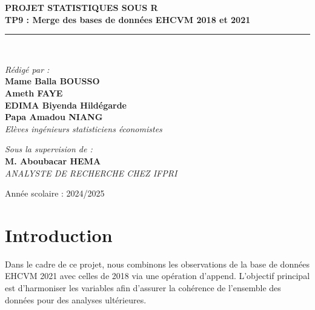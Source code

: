 \documentclass[
]{article}
\begin{document}
\begin{titlepage}
\begin{center}
        \textbf{\LARGE PROJET STATISTIQUES SOUS R }\\[0.3cm]
        \textbf{\Huge \color{black} \textsf{TP9 : Merge des bases de données EHCVM 2018 et 2021}}\\[0.2cm]
        \rule{\linewidth}{0.2mm} \\[0.5cm]
        
        \begin{minipage}{0.5\textwidth}
    \begin{flushleft} \large
        \emph{\textsf{Rédigé par :}}\\
        \textbf{Mame Balla BOUSSO}\\
        \textbf{Ameth FAYE}\\
        \textbf{EDIMA Biyenda Hildégarde}\\
        \textbf{Papa Amadou NIANG}\\
        \textit{Elèves ingénieurs statisticiens économistes}
    \end{flushleft}
\end{minipage}
        \hfill
        \begin{minipage}{0.4\textwidth}
            \begin{flushright} \large
                \emph{\textsf{Sous la supervision de :}} \\
                \textbf{M. Aboubacar HEMA}\\
                \textit{ANALYSTE DE RECHERCHE CHEZ IFPRI }
            \end{flushright}
        \end{minipage}

        \vfill

        {\large \textsf{Année scolaire : 2024/2025}}\\[0.5cm]
        
    \end{center}
\end{titlepage}

\hypertarget{introduction}{%
\section{Introduction}\label{introduction}}

Dans le cadre de ce projet, nous combinons les observations de la base
de données EHCVM 2021 avec celles de 2018 via une opération d'append.
L'objectif principal est d'harmoniser les variables afin d'assurer la
cohérence de l'ensemble des données pour des analyses ultérieures.
\end{document}
